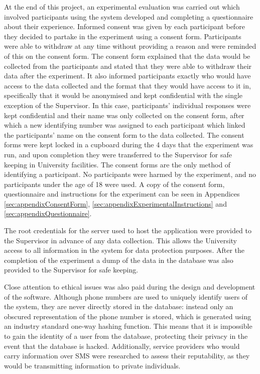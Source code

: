 \documentclass[authoryearcitations]{UoYCSproject}
\begin{document}
At the end of this project, an experimental evaluation was carried out which involved participants using the system developed and completing a questionnaire about their experience. Informed consent was given by each participant before they decided to partake in the experiment using a consent form. Participants were able to withdraw at any time without providing a reason and were reminded of this on the consent form. The consent form explained that the data would be collected from the participants and stated that they were able to withdraw their data after the experiment. It also informed participants exactly who would have access to the data collected and the format that they would have access to it in, specifically that it would be anonymised and kept confidential with the single exception of the Supervisor. In this case, participants' individual responses were kept confidential and their name was only collected on the consent form, after which a new identifying number was assigned to each participant which linked the participants' name on the consent form to the data collected. The consent forms were kept locked in a cupboard during the 4 days that the experiment was run, and upon completion they were transferred to the Supervisor for safe keeping in University facilities. The consent forms are the only method of identifying a participant. No participants were harmed by the experiment, and no participants under the age of 18 were used. A copy of the consent form, questionnaire and instructions for the experiment can be seen in Appendices \ref{sec:appendixConsentForm}, \ref{sec:appendixExperimentalInstructions} and \ref{sec:appendixQuestionnaire}.

The root credentials for the server used to host the application were provided to the Supervisor in advance of any data collection. This allows the University access to all information in the system for data protection purposes. After the completion of the experiment a dump of the data in the database was also provided to the Supervisor for safe keeping.

Close attention to ethical issues was also paid during the design and development of the software. Although phone numbers are used to uniquely identify users of the system, they are never directly stored in the database: instead only an obscured representation of the phone number is stored, which is generated using an industry standard one-way hashing function. This means that it is impossible to gain the identity of a user from the database, protecting their privacy in the event that the database is hacked.  Additionally, service providers who would carry information over SMS were researched to assess their reputability, as they would be transmitting information to private individuals.
\end{document}

